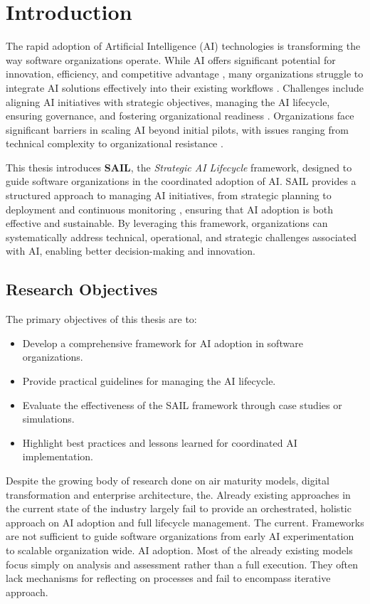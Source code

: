 \documentclass[]{imc-inf}
\begin{document}
	\mainmatter

\chapter{Introduction}
	
	The rapid adoption of Artificial Intelligence (AI) technologies is transforming the way software organizations operate. While AI offers significant potential for innovation, efficiency, and competitive advantage \citep{McKinsey2024b, Dzreke2024}, many organizations struggle to integrate AI solutions effectively into their existing workflows \citep{Deloitte2025, Haefner2023}. Challenges include aligning AI initiatives with strategic objectives, managing the AI lifecycle, ensuring governance, and fostering organizational readiness \citep{IBM2024, Ransbotham2020}. Organizations face significant barriers in scaling AI beyond initial pilots, with issues ranging from technical complexity to organizational resistance \citep{Makarius2020}.
	
	This thesis introduces \textbf{SAIL}, the \textit{Strategic AI Lifecycle} framework, designed to guide software organizations in the coordinated adoption of AI. SAIL provides a structured approach to managing AI initiatives, from strategic planning to deployment and continuous monitoring \citep{Stone2025}, ensuring that AI adoption is both effective and sustainable. By leveraging this framework, organizations can systematically address technical, operational, and strategic challenges associated with AI, enabling better decision-making and innovation.
	
	\section{Research Objectives}
	
	The primary objectives of this thesis are to:
	\begin{itemize}
		\item Develop a comprehensive framework for AI adoption in software organizations.
		\item Provide practical guidelines for managing the AI lifecycle.
		\item Evaluate the effectiveness of the SAIL framework through case studies or simulations.
		\item Highlight best practices and lessons learned for coordinated AI implementation.
	\end{itemize}

	Despite the growing body of research done on air maturity models, digital transformation and enterprise architecture, the. Already existing approaches in the current state of the industry largely fail to provide an orchestrated, holistic approach on AI adoption and full lifecycle management. The current. Frameworks are not sufficient to guide software organizations from early AI experimentation to scalable organization wide. AI adoption. Most of the already existing models focus simply on analysis and assessment rather than a full execution. They often lack mechanisms for reflecting on processes and fail to encompass iterative approach.
	
\end{document}
